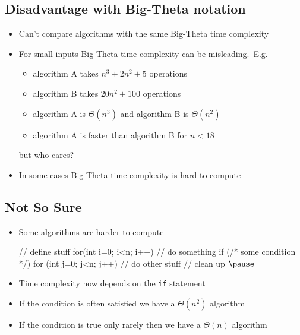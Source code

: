 
\begin{slide}
\section[-1]{Disadvantage with Big-Theta notation}

\begin{PauseHighLight}
  \begin{itemize}
  \item Can't compare algorithms with the same Big-Theta time
    complexity\pause
  \item For small inputs Big-Theta time complexity can be
    misleading.\pause\  E.g.
    \begin{itemize}
    \item algorithm A takes $n^3 + 2n^2+5$ operations
    \item algorithm B takes $20 n^2 +100$ operations
    \item algorithm A is $\Theta(n^3)$ and algorithm B is $\Theta(n^2)$
    \item algorithm A is faster than algorithm B for $n<18$\pause
    \end{itemize}
    but who cares?\pause
  \item In some cases Big-Theta time complexity is hard to compute\pause
  \end{itemize}
\end{PauseHighLight}
\end{slide}


\begin{slide}
\section[-1.5]{Not So Sure}

\begin{PauseHighLight}
  \begin{itemize}
  \item Some algorithms are harder to compute
\begin{java}
// define stuff
for(int i=0; i<n; i++)  {
  // do something
  if (/* some condition */) {
    for (int j=0; j<n; j++) {
      // do other stuff
    }
  }
}
// clean up $\pause$
\end{java}\vspace{-0.5cm}
\item Time complexity now depends on the \texttt{if} statement\pause
\item If the condition is often satisfied we have a $\Theta(n^2)$
  algorithm\pause
\item If the condition is true only rarely then we have a $\Theta(n)$
  algorithm\pause
\end{itemize}
\end{PauseHighLight}

\end{slide}

